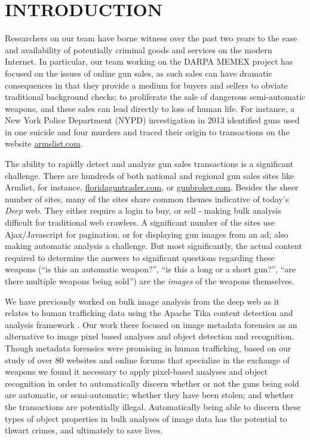 \section{INTRODUCTION}

Researchers on our team have borne witness over the past two years to the ease and availability of potentially criminal goods and services on the modern Internet. In particular, our team working on the DARPA MEMEX project has focused on the issues of online gun sales, as such sales can have dramatic consequences in that they provide a medium for buyers and sellers to obviate traditional background checks; to proliferate the sale of dangerous semi-automatic weapons, and these sales can lead directly to loss of human life. For instance, a New York Police Department (NYPD) investigation in 2013 identified guns used in one suicide and four murders and traced their origin to transactions on the website \url{armslist.com}\cite{raja_2016}. 

The ability to rapidly detect and analyze gun sales transactions is a significant challenge. There are hundreds of both national and regional gun sales sites like Armlist, for instance, \url{floridaguntrader.com}, or \url{gunbroker.com}. Besides the sheer number of sites, many of the sites share common themes indicative of today's {\em Deep} web. They either require a login to buy, or sell - making bulk analysis difficult for traditional web crawlers. A significant number of the sites use Ajax/Javascript for pagination, or for displaying gun images from an ad; also making automatic analysis a challenge. But most significantly, the actual content required to determine the answers to significant questions regarding these weapons (``is this an automatic weapon?'', ``is this a long or a short gun?'', ``are there multiple weapons being sold'') are the {\em images} of the weapons themselves. 

We have previously worked on bulk image analysis from the deep web as it relates to human trafficking data \cite{mattmann7tg} using the Apache Tika content detection and analysis framework \cite{mattmann2011tika}. Our work there focused on image metadata forensics as an alternative to image pixel based analyses and object detection and recognition. Though metadata forensics were promising in human trafficking, based on our study of over 80 websites and online forums that specialize in the exchange of weapons we found it necessary to apply pixel-based analyses and object recognition in order to automatically discern whether or not the guns being sold are automatic, or semi-automatic; whether they have been stolen; and whether the transactions are potentially illegal. Automatically being able to discern these types of object properties in bulk analyses of image data has the potential to thwart crimes, and ultimately to save lives.




